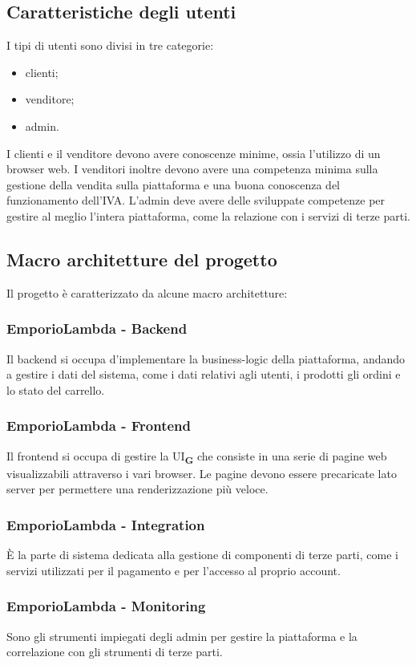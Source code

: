 \subsection{Caratteristiche degli utenti}
I tipi di utenti sono divisi in tre categorie:
\begin{itemize}
    \item clienti;
    \item venditore;
    \item admin.
\end{itemize}
I clienti e il venditore devono avere conoscenze minime, ossia l'utilizzo di un browser web. I venditori inoltre devono avere una competenza minima sulla gestione della vendita sulla piattaforma e una buona conoscenza del funzionamento dell'IVA. L'admin deve avere delle sviluppate competenze per gestire al meglio l'intera piattaforma, come la relazione con i servizi di terze parti.
\subsection{Macro architetture del progetto}
Il progetto è caratterizzato da alcune macro architetture:
\subsubsection{EmporioLambda - Backend}
Il backend si occupa d'implementare la business-logic della piattaforma, andando a gestire i dati del sistema, come i dati relativi agli utenti, i prodotti gli ordini e lo stato del carrello. 
\subsubsection{EmporioLambda - Frontend}
Il frontend si occupa di gestire la UI\textsubscript{\textbf{G}} che consiste in una serie di pagine web visualizzabili attraverso i vari browser. Le pagine devono essere precaricate lato server per permettere una renderizzazione più veloce.
\subsubsection{EmporioLambda - Integration}
È la parte di sistema dedicata alla gestione di componenti di terze parti, come i servizi utilizzati per il pagamento e per l'accesso al proprio account.
\subsubsection{EmporioLambda - Monitoring}
Sono gli strumenti impiegati degli admin per gestire la piattaforma e la correlazione con gli strumenti di terze parti.






